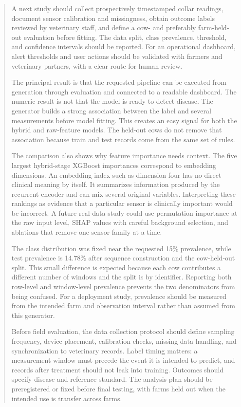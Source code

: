\documentclass[journal]{IEEEtran}
\begin{document}
\begin{abstract}
A next study should collect prospectively timestamped collar readings, document sensor calibration and missingness, obtain outcome labels reviewed by veterinary staff, and define a cow- and preferably farm-held-out evaluation before fitting. The data split, class prevalence, threshold, and confidence intervals should be reported. For an operational dashboard, alert thresholds and user actions should be validated with farmers and veterinary partners, with a clear route for human review.

The principal result is that the requested pipeline can be executed from generation through evaluation and connected to a readable dashboard. The numeric result is not that the model is ready to detect disease. The generator builds a strong association between the label and several measurements before model fitting. This creates an easy signal for both the hybrid and raw-feature models. The held-out cows do not remove that association because train and test records come from the same set of rules.

The comparison also shows why feature importance needs context. The five largest hybrid-stage XGBoost importances correspond to embedding dimensions. An embedding index such as dimension four has no direct clinical meaning by itself. It summarizes information produced by the recurrent encoder and can mix several original variables. Interpreting these rankings as evidence that a particular sensor is clinically important would be incorrect. A future real-data study could use permutation importance at the raw input level, SHAP values with careful background selection, and ablations that remove one sensor family at a time.

The class distribution was fixed near the requested 15\% prevalence, while test prevalence is 14.78\% after sequence construction and the cow-held-out split. This small difference is expected because each cow contributes a different number of windows and the split is by identifier. Reporting both row-level and window-level prevalence prevents the two denominators from being confused. For a deployment study, prevalence should be measured from the intended farm and observation interval rather than assumed from this generator.

Before field evaluation, the data collection protocol should define sampling frequency, device placement, calibration checks, missing-data handling, and synchronization to veterinary records. Label timing matters: a measurement window must precede the event it is intended to predict, and records after treatment should not leak into training. Outcomes should specify disease and reference standard. The analysis plan should be preregistered or fixed before final testing, with farms held out when the intended use is transfer across farms.


\end{abstract}
\end{document}
